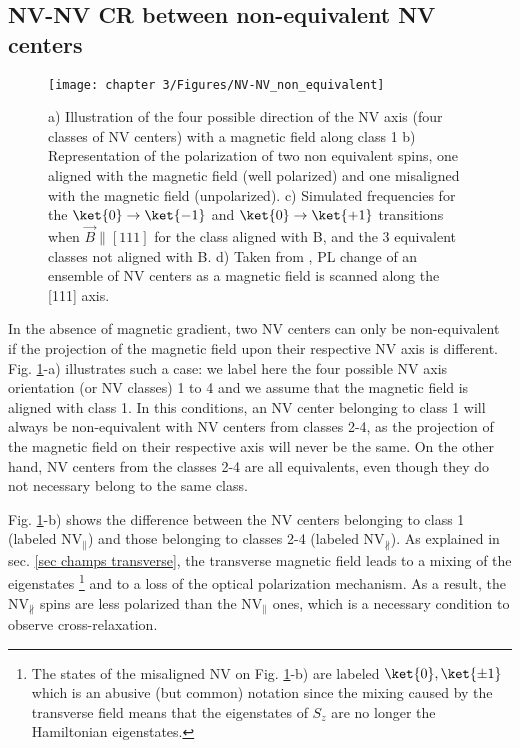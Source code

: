 \documentclass[a4paper, 11pt]{report}
\begin{document}
\subsection{NV-NV CR between non-equivalent NV centers}
\label{non_equi_valent_CR}
\begin{figure}[h]
\centering
\texttt{[image: chapter 3/Figures/NV-NV\_non\_equivalent]}
\caption{a) Illustration of the four possible direction of the NV axis (four classes of NV centers) with a magnetic field along class 1 b) Representation of the polarization of two non equivalent spins, one aligned with the magnetic field (well polarized) and one misaligned with the magnetic field (unpolarized). c) Simulated frequencies for the $\ket{0} \to \ket{-1}$ and $\ket{0} \to \ket{+1}$ transitions when $\vec{B}\parallel [111]$ for the class aligned with B, and the 3 equivalent classes not aligned with B. d) Taken from \citep{armstrong2010nv}, PL change of an ensemble of NV centers as a magnetic field is scanned along the [111] axis.}
\label{non-equivalent NV-NV}
\end{figure}

In the absence of magnetic gradient, two NV centers can only be non-equivalent if the projection of the magnetic field upon their respective NV axis is different. Fig. \ref{non-equivalent NV-NV}-a) illustrates such a case: we label here the four possible NV axis orientation (or NV classes) 1 to 4 and we assume that the magnetic field is aligned with class 1. In this conditions, an NV center belonging to class 1 will always be non-equivalent with NV centers from classes 2-4, as the projection of the magnetic field on their respective axis will never be the same. On the other hand, NV centers from the classes 2-4 are all equivalents, even though they do not necessary belong to the same class.

Fig. \ref{non-equivalent NV-NV}-b) shows the difference between the NV centers belonging to class 1 (labeled NV$_\parallel$) and those belonging to classes 2-4 (labeled NV$_\nparallel$). As explained in sec. \ref{sec champs transverse}, the transverse magnetic field leads to a mixing of the eigenstates \footnote{The states of the misaligned NV on Fig. \ref{non-equivalent NV-NV}-b) are labeled $\ket{0},\ket{\pm 1}$ which is an abusive (but common) notation since the mixing caused by the transverse field means that the eigenstates of $S_z$ are no longer the Hamiltonian eigenstates.} and to a loss of the optical polarization mechanism. As a result, the NV$_\nparallel$ spins are less polarized than the NV$_\parallel$ ones, which is a necessary condition to observe cross-relaxation.
\end{document}
